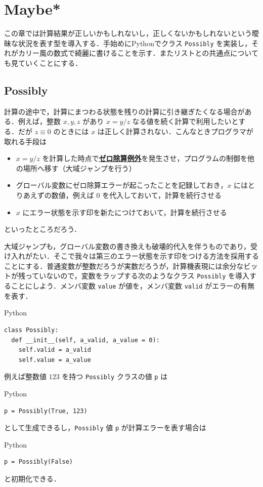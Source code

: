 \documentclass[a5paper,twoside,fleqn,draft]{jsbook}
\newcommand{\programminglanguage}[1]{\textsf{#1}}
\newcommand{\python}{\programminglanguage{Python}}
\newenvironment{leader}{\begingroup\gt}{\endgroup}
\newcommand{\keyword}[1]{{\underline{\textbf{#1}}}}
\newcommand{\code}[1]{\texttt{#1}}
\newenvironment{pythoncode}{\begin{itembox}[r]{\python}}{\end{itembox}}
\begin{document}
\chapter{Maybe*}
\label{ch:maybe}

\begin{leader}
この章では計算結果が正しいかもしれないし，正しくないかもしれないという曖昧な状況を表す型を導入する．手始めに\python でクラス \code{Possibly} を実装し，それがカリー風の数式で綺麗に書けることを示す．またリストとの共通点についても見ていくことにする．
\end{leader}

\section{Possibly}

計算の途中で，計算にまつわる状態を残りの計算に引き継ぎたくなる場合がある．例えば，整数 $x,y,z$ があり $x=y/z$ なる値を続く計算で利用したいとする．だが $z\equiv0$ のときには $x$ は正しく計算されない．こんなときプログラマが取れる手段は
\begin{itemize}
\item $x=y/z$ を計算した時点で\keyword{ゼロ除算例外}を発生させ，プログラムの制御を他の場所へ移す（大域ジャンプを行う）
\item グローバル変数にゼロ除算エラーが起こったことを記録しておき，$x$ にはとりあえずの数値，例えば $0$ を代入しておいて，計算を続行させる
\item $x$ にエラー状態を示す印を新たにつけておいて，計算を続行させる
\end{itemize}
といったところだろう．

大域ジャンプも，グローバル変数の書き換えも破壊的代入を伴うものであり，受け入れがたい．そこで我々は第三のエラー状態を示す印をつける方法を採用することにする．普通変数が整数だろうが実数だろうが，計算機表現には余分なビットが残っていないので，変数をラップする次のようなクラス \code{Possibly} を導入することにしよう．メンバ変数 \code{value} が値を，メンバ変数 \code{valid} がエラーの有無を表す．
\begin{pythoncode}
\begin{verbatim}
class Possibly:
  def __init__(self, a_valid, a_value = 0):
    self.valid = a_valid
    self.value = a_value
\end{verbatim}
\end{pythoncode}

例えば整数値 $123$ を持つ \code{Possibly} クラスの値 \code{p} は
\begin{pythoncode}
\begin{verbatim}
p = Possibly(True, 123)
\end{verbatim}
\end{pythoncode}
として生成できるし，\code{Possibly} 値 \code{p} が計算エラーを表す場合は
\begin{pythoncode}
\begin{verbatim}
p = Possibly(False)
\end{verbatim}
\end{pythoncode}
と初期化できる．
\end{document}
